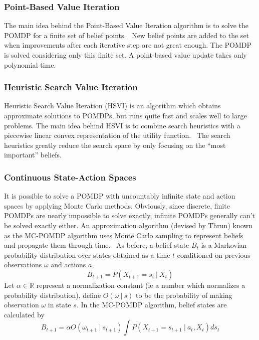 \documentclass[tog]{acmsiggraph}
\newcommand{\given}[1][]{\:#1\vert\:}
\newcommand{\reals}{\mathbb{R}}
\begin{document}
\subsubsection{Point-Based Value Iteration}
The main idea behind the Point-Based Value Iteration algorithm is to solve the POMDP for a finite 
set of belief points.~\cite{pineau2003point} New belief points are added to the set when improvements 
after each iterative step are not great enough. The POMDP is solved considering only this finite 
set. A point-based value update takes only polynomial time.

\subsubsection{Heuristic Search Value Iteration}
Heuristic Search Value Iteration (HSVI) is an algorithm which obtains approximate solutions to POMDPs, 
but runs quite fast and scales well to large problems. The main idea behind HSVI is to combine search 
heuristics with a piecewise linear convex representation of the utility function.~\cite{smith2004heuristic} 
The search heuristics greatly reduce the search space by only focusing on the ``most important'' beliefs.

\subsubsection{Continuous State-Action Spaces}
It is possible to solve a POMDP with uncountably infinite state and action spaces by applying Monte Carlo methods. Obviously, since discrete, finite POMDPs are nearly impossible to solve exactly, infinite POMDPs generally can't be solved exactly either. An approximation algorithm (devised by Thrun) known as the MC-POMDP algorithm uses Monte Carlo sampling to represent beliefs and propagate them through time.~\cite{thrun1999monte} As before, a belief state $B_t$ is a Markovian probability distribution over states obtained as a time $t$ conditioned on previous observations $\omega$ and actions $a$,
\begin{equation*}
  B_{t+1} = P \left( X_{t+1} = s_i \given X_t  \right)
\end{equation*}
Let $\alpha \in \reals$ represent a normalization constant (ie a number which normalizes a probability distribution), define $O \left( \omega \given s \right)$ to be the probability of making observation $\omega$ in state $s$. In the MC-POMDP algorithm, belief states are calculated by
\begin{equation*}
  B_{t+1} = \alpha O \left( \omega_{t+1} \given s_{t+1} \right) \int P \left( X_{t+1} = s_{t+1} \given a_t, X_t  \right) ds_t
\end{equation*}


\nocite{*}

\end{document}
